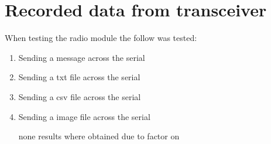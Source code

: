 \section{Recorded data from transceiver}
When testing  the radio module the follow was tested:
\begin{enumerate}
    \item Sending a message across the serial

    \item Sending a txt file across the serial

    \item Sending a csv file across the serial


    \item Sending a image file across the serial

    none results where obtained due to  factor on \pageref{Discussion of Lora module}
\end{enumerate}

